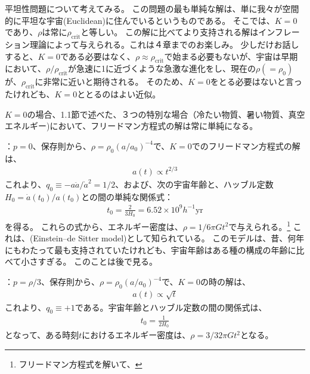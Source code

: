 \documentclass[11pt]{ltjsarticle}
\theoremstyle{plain}
\theoremstyle{break}
\begin{document}
平坦性問題について考えてみる。
この問題の最も単純な解は、単に我々が空間的に平坦な宇宙(Euclidean)に住んでいるというものである。%
そこでは、$K=0$であり、$\rho$は常に$\rho_{\text{crit}}$と等しい。%
この解に比べてより支持される解はインフレーション理論によって与えられる。これは４章までのお楽しみ。
少しだけお話しすると、$K = 0$である必要はなく、$\rho \approx \rho_{\text{crit}}$で始まる必要もないが、宇宙は早期において、$\rho/\rho_{\text{crit}}$が急速に1に近づくような急激な進化をし、現在の$\rho( =\rho_{0} )$が、$\rho_{\text{crit}}$に非常に近いと期待される。%
そのため、$K=0$をとる必要はないと言ったけれども、$K=0$ととるのはよい近似。

$K=0$の場合、1.1節で述べた、３つの特別な場合（冷たい物質、暑い物質、真空エネルギー)において、フリードマン方程式の解は常に単純になる。

\noindent
{}：$p = 0$、保存則から、$\rho=\rho_{0}\left(a / a_{0}\right)^{-4}$で、$K=0$でのフリードマン方程式の解は、
\begin{align*}
  a(t) \propto t^{2 / 3}
\end{align*}%
これより、$ q_{0} \equiv-a \ddot{a} / \dot{a}^{2}=1 / 2 $、および、次の宇宙年齢と、ハッブル定数$H_0 = \dot{a}(t_0)/a(t_0)$との間の単純な関係式：
\begin{align}
  t_{0}=\frac{2}{3 H_{0}}=6.52 \times 10^{9} h^{-1} \mathrm{yr}
\end{align}%
を得る。
これらの式から、エネルギー密度は、$\rho = 1/6\pi G t^2$で与えられる。\footnote{フリードマン方程式を解いて、}
これは、(Einstein–de Sitter model)として知られている。
このモデルは、昔、何年にもわたって最も支持されていたけれども、宇宙年齢はある種の構成の年齢に比べて小さすぎる。
このことは後で見る。
\vspace{0.8pt}

\noindent
{}：$p = \rho/3$、保存則から、$\rho=\rho_{0}\left(a / a_{0}\right)^{-4} $で、$K=0$の時の解は、
\begin{align}
  a(t) \propto \sqrt{t}
\end{align}%
これより、$ q_{0} \equiv  +1 $である。宇宙年齢とハッブル定数の間の関係式は、
\begin{align}
  t_0 = \frac{1}{2 H_0}
\end{align}%
となって、ある時刻$t$におけるエネルギー密度は、$\rho = 3/32\pi G t^2 $となる。
\vspace{0.8pt}
\end{document}
